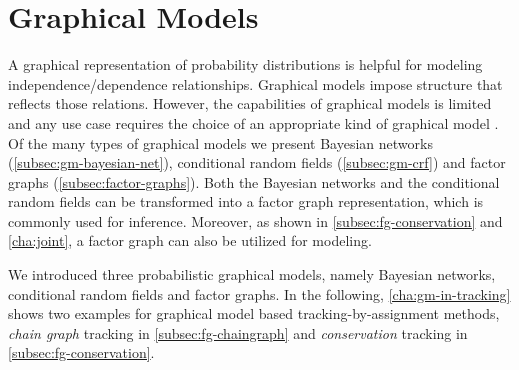 \section{Graphical Models}
\label{sec:gm-graphical-models}

A graphical representation of probability distributions is helpful for modeling
independence/dependence relationships. Graphical models impose structure that reflects those
relations. However, the capabilities of graphical models is limited and any use case requires the
choice of an appropriate kind of graphical model \citep[57]{barber_12_bayesian}. Of
the many types of graphical models we present Bayesian networks (\cref{subsec:gm-bayesian-net}),
conditional random fields (\cref{subsec:gm-crf}) and factor graphs
(\cref{subsec:factor-graphs}). Both the Bayesian networks and the conditional random fields can be
transformed into a factor graph representation, which is commonly used for inference. Moreover, as
shown in \cref{subsec:fg-conservation} and \cref{cha:joint}, a factor graph can also be utilized for
modeling.





We introduced three probabilistic graphical models, namely Bayesian networks, conditional random
fields and factor graphs. In the following, \cref{cha:gm-in-tracking} shows two examples for
graphical model based tracking-by-assignment methods, \emph{chain graph} tracking in
\cref{subsec:fg-chaingraph} and \emph{conservation} tracking in \cref{subsec:fg-conservation}.

